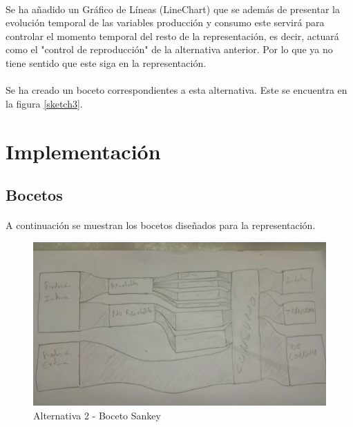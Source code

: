 \documentclass{article}
\begin{document}
			\paragraph{}
			Se ha añadido un Gráfico de Líneas (LineChart) que se además de presentar la evolución temporal de las variables producción y consumo este servirá para controlar el momento temporal del resto de la representación, es decir, actuará como el "control de reproducción" de la alternativa anterior. Por lo que ya no tiene sentido que este siga en la representación. 

			\paragraph{}
			Se ha creado un boceto correspondientes a esta alternativa. Este se encuentra en la figura \ref{sketch3}.

	\section{Implementación}

		\subsection{Bocetos}
		
			\paragraph{}
			A continuación se muestran los bocetos diseñados para la representación.
		
			\begin{figure}[H]
				\centering
				\includegraphics[width=140mm]{../res/sketch-sankey.jpg}
				\caption{Alternativa 2 - Boceto Sankey \label{sketchSankey}}
			\end{figure}
			
\end{document}
